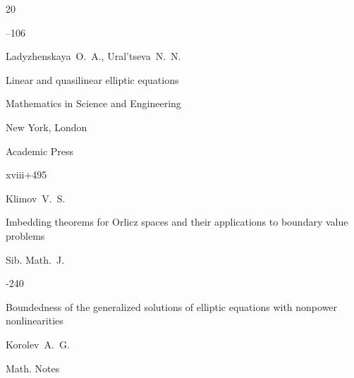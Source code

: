 \begin{thebibliography}{20}


--106










\by Ladyzhenskaya~O.~A., Ural'tseva~N.~N.

\book Linear and quasilinear elliptic equations

\serial Mathematics in Science and Engineering


\publaddr New York, London

\publ Academic Press

\totalpages xviii+495








\by Klimov~V.~S.

\paper Imbedding theorems for Orlicz spaces and their applications to boundary value problems

\jour Sib. Math.~J.



-240










\paper Boundedness of the generalized solutions of elliptic equations with nonpower nonlinearities

\by Korolev~A.~G.

\jour Math. Notes





\end{thebibliography}
